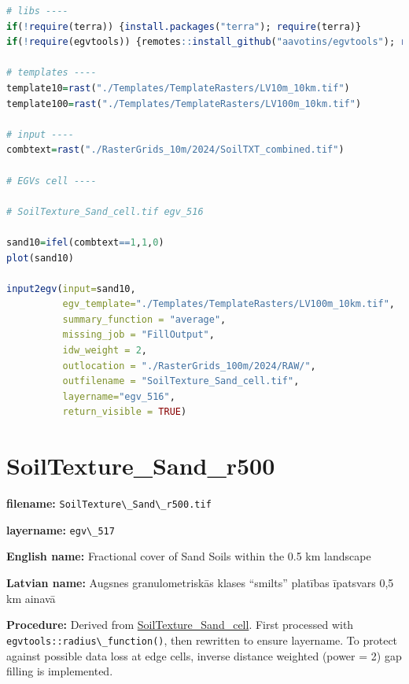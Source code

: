 \documentclass[
]{book}
\newcommand{\passthrough}[1]{#1}
\begin{document}
\begin{lstlisting}[language=R]
# libs ----
if(!require(terra)) {install.packages("terra"); require(terra)}
if(!require(egvtools)) {remotes::install_github("aavotins/egvtools"); require(egvtools)}

# templates ----
template10=rast("./Templates/TemplateRasters/LV10m_10km.tif")
template100=rast("./Templates/TemplateRasters/LV100m_10km.tif")

# input ----
combtext=rast("./RasterGrids_10m/2024/SoilTXT_combined.tif")

# EGVs cell ----

# SoilTexture_Sand_cell.tif egv_516

sand10=ifel(combtext==1,1,0)
plot(sand10)

input2egv(input=sand10,
          egv_template="./Templates/TemplateRasters/LV100m_10km.tif",
          summary_function = "average",
          missing_job = "FillOutput",
          idw_weight = 2,
          outlocation = "./RasterGrids_100m/2024/RAW/",
          outfilename = "SoilTexture_Sand_cell.tif",
          layername="egv_516",
          return_visible = TRUE)
\end{lstlisting}

\section{SoilTexture\_Sand\_r500}\label{ch06.517}

\textbf{filename:} \passthrough{\lstinline!SoilTexture\_Sand\_r500.tif!}

\textbf{layername:} \passthrough{\lstinline!egv\_517!}

\textbf{English name:} Fractional cover of Sand Soils within the 0.5 km landscape

\textbf{Latvian name:} Augsnes granulometriskās klases ``smilts'' platības īpatsvars 0,5 km ainavā

\textbf{Procedure:} Derived from \hyperref[ch06.516]{SoilTexture\_Sand\_cell}. First processed
with \passthrough{\lstinline!egvtools::radius\_function()!}, then rewritten to ensure layername. To protect against
possible data loss at edge cells, inverse distance weighted (power = 2) gap filling
is implemented.
\end{document}
